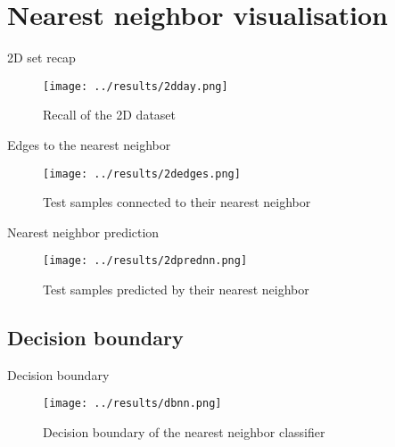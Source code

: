 \section{Nearest neighbor visualisation}

\begin{frame}{2D set recap}
  \begin{figure}[!htbp]
    \centering
    \small{\caption{Recall of the 2D dataset}}
    \texttt{[image: ../results/2dday.png]}
  \end{figure}

  \note{ }

\end{frame}

\begin{frame}{Edges to the nearest neighbor}
  \begin{figure}[!htbp]
    \centering
    \small{\caption{Test samples connected to their nearest neighbor}}
    \texttt{[image: ../results/2dedges.png]}
  \end{figure}

  \note{ }

\end{frame}

\begin{frame}{Nearest neighbor prediction}
  \begin{figure}[!htbp]
    \centering
    \small{\caption{Test samples predicted by their nearest neighbor}}
    \texttt{[image: ../results/2dprednn.png]}
  \end{figure}


\end{frame}

\subsection{Decision boundary}

\begin{frame}{Decision boundary}
  \begin{figure}[!htbp]
    \centering
    \small{\caption{Decision boundary of the nearest neighbor classifier}}
    \texttt{[image: ../results/dbnn.png]}
  \end{figure}


\end{frame}
